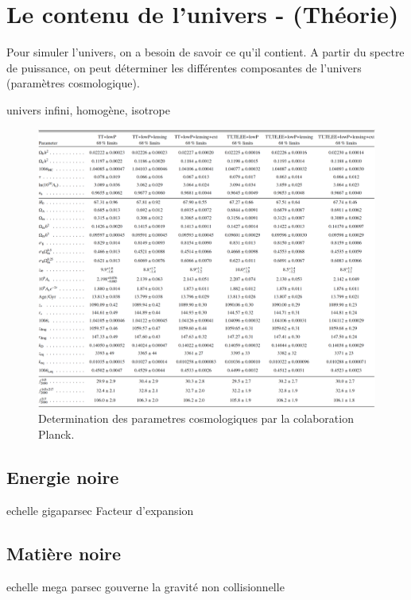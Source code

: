 \section{Le contenu de l'univers - (Théorie)}

Pour simuler l'univers, on a besoin de savoir ce qu'il contient. 
A partir du spectre de puissance, on peut déterminer les différentes composantes de l'univers (paramètres cosmologique).

univers infini, homogène, isotrope




\begin{figure}[bth]
        \includegraphics[width=.95\linewidth]{img/01/table_planck.pdf} 
        \caption{Determination des parametres cosmologiques par la colaboration Planck.}
 		\label{fig:planck_parameters}
\end{figure}

\citep{planck_collaboration_planck_2016}

\subsection{Energie noire}

echelle gigaparsec
Facteur d'expansion

\subsection{Matière noire}

echelle mega parsec
gouverne la gravité
non collisionnelle

